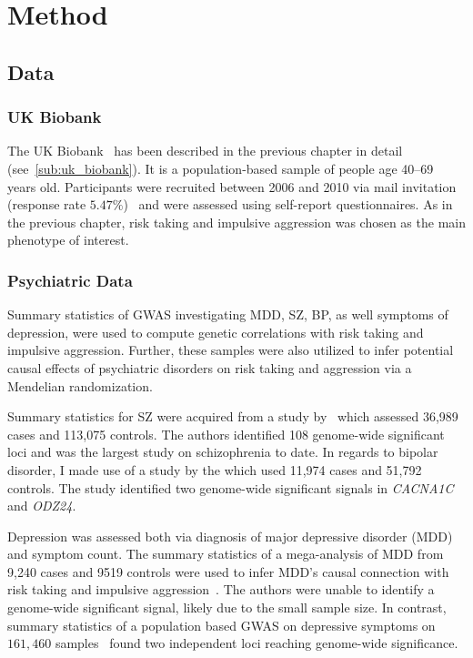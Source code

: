\section{Method}
\label{sec:method_psych}

\subsection{Data}
\label{sub:data}

\subsubsection{UK Biobank}
\label{ssub:uk_biobank_psych}

The UK Biobank~\cite{Allen2014} has been described in the previous chapter in detail (see~\ref{sub:uk_biobank}).
It is a population-based sample of people age 40--69 years old. 
Participants were recruited between 2006 and 2010 via mail invitation (response rate $5.47\%$)~\cite{Sudlow2015} and were assessed using self-report questionnaires.
As in the previous chapter, risk taking and impulsive aggression was chosen as the main phenotype of interest.

\subsubsection{Psychiatric Data}
\label{ssub:psychiatric_data}

Summary statistics of GWAS investigating MDD, SZ, BP, as well symptoms of depression, were used to compute genetic correlations with risk taking and impulsive aggression.
Further, these samples were also utilized to infer potential causal effects of psychiatric disorders on risk taking and aggression via a Mendelian randomization.

Summary statistics for SZ were acquired from a study by~\citet{Ripke2014} which assessed 36,989 cases and 113,075 controls.
The authors identified 108 genome-wide significant loci and was the largest study on schizophrenia to date.
In regards to bipolar disorder, I made use of a study by the \citet{PsychiatricGWASConsortiumBipolarDisorderWorkingGroup2011} which used 11,974 cases and 51,792 controls.
The study identified two genome-wide significant signals in \textit{CACNA1C} and \textit{ODZ24}.

Depression was assessed both via diagnosis of major depressive disorder (MDD) and symptom count. 
The summary statistics of a mega-analysis of MDD from 9,240 cases and 9519 controls were used to infer MDD's causal connection with risk taking and impulsive aggression~\cite{MajorDepressiveDisorderWorkingGroupofthePsychiatricGWASConsortium2013}.
The authors were unable to identify a genome-wide significant signal, likely due to the small sample size.
In contrast, summary statistics of a population based GWAS on depressive symptoms on $161,460$ samples~\cite{Okbay2016} found two independent loci reaching genome-wide significance.  

